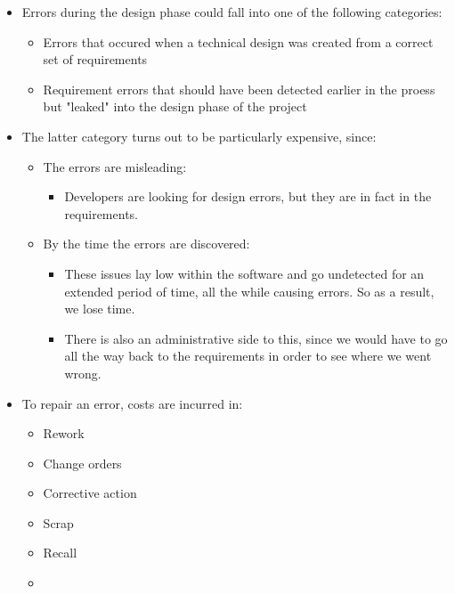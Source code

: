 \documentclass[12pt]{book}
\begin{document}
\begin{itemize}
  \item Errors during the design phase could fall into one of the following categories:
  \begin{itemize}
    \item Errors that occured when a technical design was created from a correct set of requirements
    \item Requirement errors that should have been detected earlier in the proess but "leaked" into the design phase of the project
  \end{itemize}

  \item The latter category turns out to be particularly expensive, since:
  \begin{itemize}
    \item The errors are misleading:
    \begin{itemize}
      \item Developers are looking for design errors, but they are in fact in the requirements.
    \end{itemize} 
    \item By the time the errors are discovered:
    \begin{itemize}
      \item These issues lay low within the software and go undetected for an extended period of time, all the while causing errors. So as a result, we lose time.
    \item There is also an administrative side to this, since we would have to go all the way back to the requirements in order to see where we went wrong.
    \end{itemize}
    
  \end{itemize} 


  \item To repair an error, costs are incurred in:
  \begin{itemize}
    \item Rework
    \item Change orders
    \item Corrective action
    \item Scrap
    \item Recall
    \item %
  \end{itemize} 
\end{itemize}

\newpage
\end{document}
